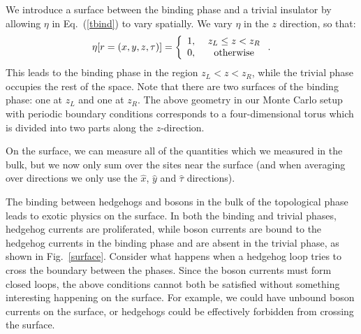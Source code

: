 We introduce a surface between the binding phase and a trivial insulator by allowing $\eta$ in Eq.~(\ref{tbind}) to vary spatially.
We vary $\eta$ in the $z$ direction, so that:
\begin{equation}
\eta[r=(x,y,z,\tau)]=
\left\{ \begin{array}{cc}
1, &~ z_L\leq z<z_R\\
0, &~ \rm{otherwise}\\
\end{array}\right..
\label{eta_r}
\end{equation}
This leads to the binding phase in the region $z_L < z < z_R$, while the trivial phase occupies the rest of the space. Note that there are two surfaces of the binding phase: one at $z_L$ and one at $z_R$. The above geometry in our Monte Carlo setup with periodic boundary conditions corresponds to a four-dimensional torus which is divided into two parts along the $z$-direction.

On the surface, we can measure all of the quantities which we measured in the bulk, but we now only sum over the sites near the surface (and when averaging over directions we only use the $\hat{x}$, $\hat{y}$ and $\hat{\tau}$ directions). 

The binding between hedgehogs and bosons in the bulk of the topological phase leads to exotic physics on the surface. In both the binding and trivial phases, hedgehog currents are proliferated, while boson currents are bound to the hedgehog currents in the binding phase and are absent in the trivial phase, as shown in Fig.~\ref{surface}. Consider what happens when a hedgehog loop tries to cross the boundary between the phases. Since the boson currents must form closed loops, the above conditions cannot both be satisfied without something interesting happening on the surface. For example, we could have unbound boson currents on the surface, or hedgehogs could be effectively forbidden from crossing the surface.


